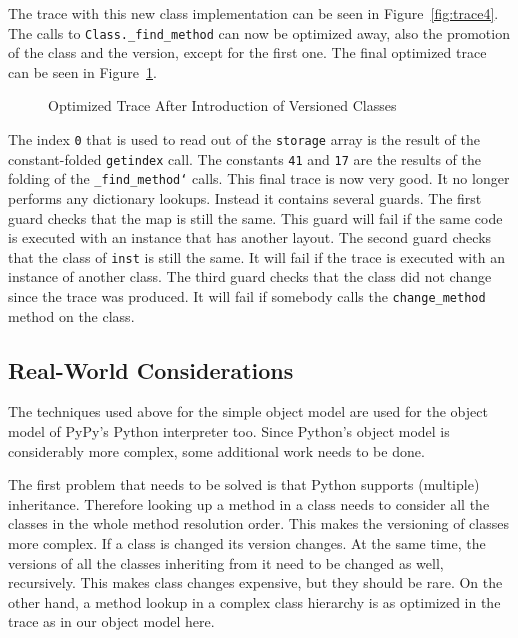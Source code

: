 \documentclass{sigplanconf}
\begin{document}
The trace with this new class implementation can be seen in
Figure~\ref{fig:trace4}.
The calls to \texttt{Class.\_find\_method} can now be optimized away, also the
promotion of the class and the version, except for the first one. The final
optimized trace can be seen in Figure~\ref{fig:trace5}.

\begin{figure}

\caption{Optimized Trace After Introduction of Versioned Classes}
\label{fig:trace5}
\end{figure}

The index \texttt{0} that is used to read out of the \texttt{storage} array is the result
of the constant-folded \texttt{getindex} call.
The constants \texttt{41} and \texttt{17} are the results of the folding of the
\texttt{\_find\_method`} calls. This final trace is now very good. It no longer performs any
dictionary lookups. Instead it contains several guards. The first guard
checks that the map is still the same. This guard will fail if the same
code is executed with an instance that has another layout. The second guard
checks that the class of \texttt{inst} is still the same. It will fail if the trace is
executed with an instance of another class. The third guard checks that the
class did not change since the trace was produced. It will fail if somebody
calls the \texttt{change\_method} method on the class.



\subsection{Real-World Considerations}

The techniques used above for the simple object model are used for the object
model of PyPy's Python interpreter too. Since Python's object model is
considerably more complex, some additional work needs to be done.

The first problem that needs to be solved is that Python supports (multiple)
inheritance. Therefore looking up a method in a class needs to consider all the
classes in the
whole method resolution order. This makes the versioning of classes more
complex. If a class is changed its version changes. At the same time, the
versions of all the classes inheriting from it need to be changed as well,
recursively. This makes class changes expensive, but they should be rare.  On the
other hand, a method lookup in a complex class hierarchy is as optimized in the
trace as in our object model here.
\end{document}
